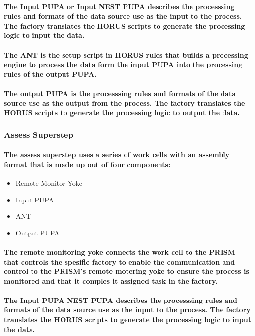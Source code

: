 \documentclass{acm_proc_article-sp}
\begin{document}
\paragraph{The Input PUPA or Input NEST PUPA describes the processsing rules and formats of the data source use as the input to the process. The factory translates the HORUS scripts to generate the processing logic to input the data.}
\paragraph{The ANT is the setup script in HORUS rules that builds a processing engine to process the data form the input PUPA into the processing rules of the output PUPA. }
\paragraph{The output PUPA is the processsing rules and formats of the data source use as the output from the process. The factory translates the HORUS scripts to generate the processing logic to output the data.}
\subsubsection{Assess Superstep}
\paragraph{The assess superstep uses a series of work cells with an assembly format that is made up out of four components:}
\begin{itemize}
\item{Remote Monitor Yoke}
\item{Input PUPA}
\item{ANT}
\item{Output PUPA}
\end{itemize}
\paragraph{The remote monitoring yoke connects the work cell to the PRISM that controls the spesific factory to enable the communication and control to the PRISM's remote motering yoke to ensure the process is monitored and that it comples it assigned task in the factory.}
\paragraph{The Input PUPA NEST PUPA describes the processsing rules and formats of the data source use as the input to the process. The factory translates the HORUS scripts to generate the processing logic to input the data.}
\end{document}
